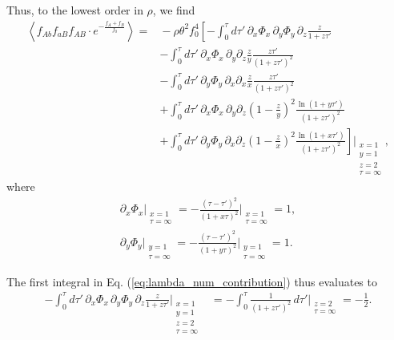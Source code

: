 \documentclass[11pt]{article}
\begin{document}
Thus, to the lowest order in $\rho$, we find
\begin{align}\label{eq:lambda_num_contribution}
    \left\langle f_{Ab}f_{aB}f_{AB}\cdot e^{-\frac{f_{A}+f_{B}}{f_0}}\right\rangle =&{} -\rho \theta^2 f_0^4 \left[
    -\int_0^{\tau} d\tau'\, \partial_x \Phi_x \, \partial_y \Phi_y \, \partial_z \frac{z}{1+z\tau'} \right. \\\nonumber
    &- \left. \int_0^{\tau} d\tau'\, \partial_x \Phi_x \, \partial_y \partial_z \frac{z}{y} \frac{z\tau'}{(1+z\tau')^2} \right. \\\nonumber
    &- \left. \int_0^{\tau} d\tau'\, \partial_y \Phi_y \, \partial_x \partial_x \frac{z}{x} \frac{z\tau'}{(1+z\tau')^2} \right. \\\nonumber
    &+ \left. \int_0^{\tau} d\tau'\, \partial_x \Phi_x \, \partial_y \partial_z \left(1-\frac{z}{y}\right)^2 \frac{\ln(1+y\tau')}{(1+z\tau')^2} \right. \\\nonumber
    &+ \left. \int_0^{\tau} d\tau'\, \partial_y \Phi_y \, \partial_x \partial_z \left(1-\frac{z}{x}\right)^2 \frac{\ln(1+x\tau')}{(1+z\tau')^2} 
    \right]\Bigg\vert_{\substack{x=1 \\ y=1 \\ z=2 \\ \tau=\infty}},
\end{align}
where 
\begin{subequations}\begin{align}
    \partial_x \Phi_x \Bigg\vert_{\substack{x=1 \\ \tau=\infty}} = 
    -\frac{(\tau-\tau')^2}{(1+x\tau)^2} \Bigg\vert_{\substack{x=1 \\ \tau=\infty}} = 1, \\
    \partial_y \Phi_y \Bigg\vert_{\substack{y=1 \\ \tau=\infty}} =
    -\frac{(\tau-\tau')^2}{(1+y\tau)^2} \Bigg\vert_{\substack{y=1 \\ \tau=\infty}} = 1.
\end{align}\end{subequations}

The first integral in Eq. (\ref{eq:lambda_num_contribution}) thus evaluates to
\begin{align}
    -\int_0^{\tau} d\tau'\, \partial_x \Phi_x \, \partial_y \Phi_y \, \partial_z \frac{z}{1+z\tau'}\Bigg\vert_{\substack{x=1 \\ y=1 \\ z=2 \\ \tau=\infty}} & = -\int_0^{\tau} \frac{1}{(1+z\tau')^2}\,d\tau'\Bigg\vert_{\substack{z=2 \\ \tau=\infty}} = -\frac{1}{2}.
\end{align}
\end{document}

